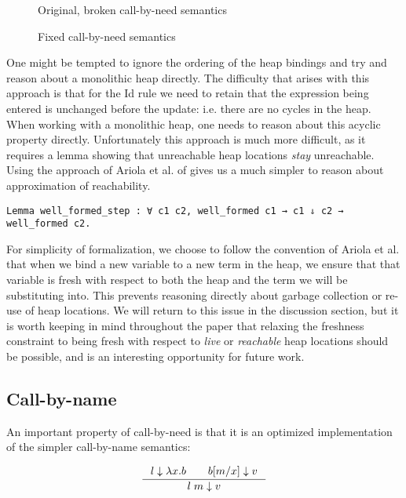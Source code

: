 \begin{figure}

\caption{Original, broken call-by-need semantics}
\label{fig:cbnbroken}
\end{figure}

\begin{figure}

\caption{Fixed call-by-need semantics}
\label{fig:cbnfixed}
\end{figure}

One might be tempted to ignore the ordering of the heap bindings and try and
reason about a monolithic heap directly. The difficulty that arises with this
approach is that for the Id rule we need to retain that the expression being
entered is unchanged before the update: i.e. there are no cycles in the heap. 
When working with a monolithic heap, one needs to reason about this acyclic
property directly. Unfortunately this approach is much more difficult, as it
requires a lemma showing that unreachable heap locations \emph{stay}
unreachable. Using the approach of Ariola et al. of gives us a much simpler to
reason about approximation of reachability. 

\begin{lstlisting}
Lemma well_formed_step : ∀ c1 c2, well_formed c1 → c1 ⇓ c2 → well_formed c2.
\end{lstlisting}

For simplicity of formalization, we choose to follow the convention of Ariola et
al. that when we bind a new variable to a new term in the heap, we ensure that
that variable is fresh with respect to both the heap and the term we will be
substituting into.  This prevents reasoning directly about garbage collection
or re-use of heap locations. We will return to this issue in the discussion
section, but it is worth keeping in mind throughout the paper that relaxing the
freshness constraint to being fresh with respect to \emph{live} or
\emph{reachable} heap locations should be possible, and is an interesting
opportunity for future work. 

\subsection{Call-by-name}
An important property of call-by-need is that it is an optimized implementation of
the simpler call-by-name semantics: 

\begin{align}
\inference{l \downarrow \lambda x. b \quad \quad b [m / x] \downarrow v}{l \; m \downarrow v}
\end{align}

